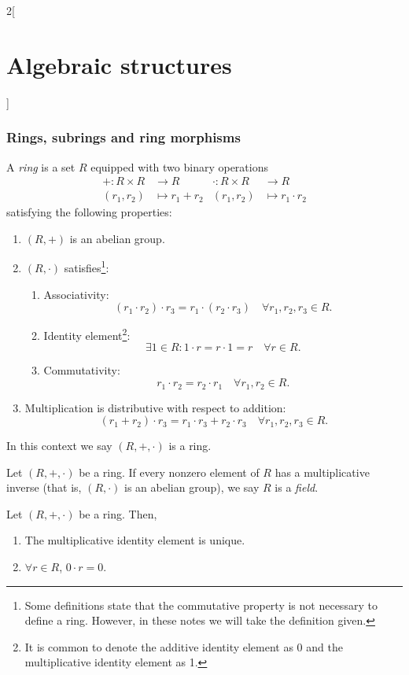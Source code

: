 \documentclass[class=article,10pt,crop=false]{standalone}
\begin{document}
\begin{multicols}{2}[\section{Algebraic structures}]
\subsubsection*{Rings, subrings and ring morphisms}
\begin{definition}[Ring]
A \textit{ring} is a set $R$ equipped with two binary operations \begin{align*}
    +:R\times R&\longrightarrow R&\cdot:R\times R&\longrightarrow R\\
    (r_1,r_2)&\longmapsto r_1+ r_2&(r_1,r_2)&\longmapsto r_1\cdot r_2
\end{align*}
satisfying the following properties:
\begin{enumerate}
    \item $(R,+)$ is an abelian group.
    \item $(R,\cdot)$ satisfies\footnote{Some definitions state that the commutative property is not necessary to define a ring. However, in these notes we will take the definition given.}:
    \begin{enumerate}
        \item Associativity: $$(r_1\cdot r_2)\cdot r_3=r_1\cdot(r_2\cdot r_3)\quad\forall r_1,r_2,r_3\in R.$$
        \item Identity element\footnote{It is common to denote the additive identity element as 0 and the multiplicative identity element as 1.}: $$\exists 1\in R:1\cdot r=r\cdot 1=r\quad\forall r\in R.$$
        \item Commutativity: $$r_1\cdot r_2=r_2\cdot r_1\quad\forall r_1,r_2\in R.$$
    \end{enumerate}
    \item Multiplication is distributive with respect to addition: $$(r_1+r_2)\cdot r_3=r_1\cdot r_3+r_2\cdot r_3\quad\forall r_1,r_2,r_3\in R.$$
\end{enumerate}
In this context we say $(R,+,\cdot)$ is a ring.
\end{definition}
\begin{definition}[Field]
Let $(R,+,\cdot)$ be a ring. If every nonzero element of $R$ has a multiplicative inverse (that is, $(R,\cdot)$ is an abelian group), we say $R$ is a \textit{field}.
\end{definition}
\begin{lemma}
Let $(R,+,\cdot)$ be a ring. Then,
\begin{enumerate}
    \item The multiplicative identity element is unique.
    \item $\forall r\in R$, $0\cdot r=0$.

\end{enumerate}
\end{lemma}
\end{multicols}
\end{document}
